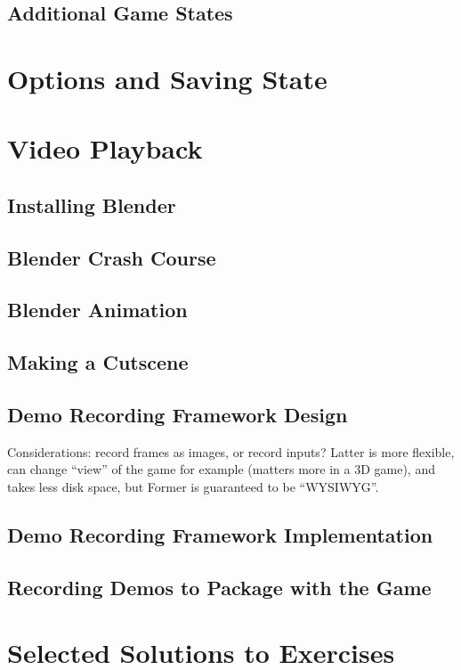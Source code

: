 \documentclass[12pt]{amsbook}
\theoremstyle{definition}
\theoremstyle{remark}
\numberwithin{figure}{chapter}
\numberwithin{table}{chapter}
\numberwithin{section}{chapter}
\numberwithin{equation}{section}
\begin{document}
\section{Additional Game States}

\chapter{Options and Saving State}

\chapter{Video Playback}
\section{Installing Blender}
\section{Blender Crash Course}
\section{Blender Animation}
\section{Making a Cutscene}
\section{Demo Recording Framework Design}
Considerations: record frames as images, or record inputs? Latter is more flexible, can change ``view'' of the game for example (matters more in a 3D game), and takes less disk space, but Former is guaranteed to be ``WYSIWYG''.

\section{Demo Recording Framework Implementation}
\section[Recording Demos]{Recording Demos to Package with the Game} 

\appendix
\chapter[Selected Solutions]{Selected Solutions to Exercises}
\end{document}
